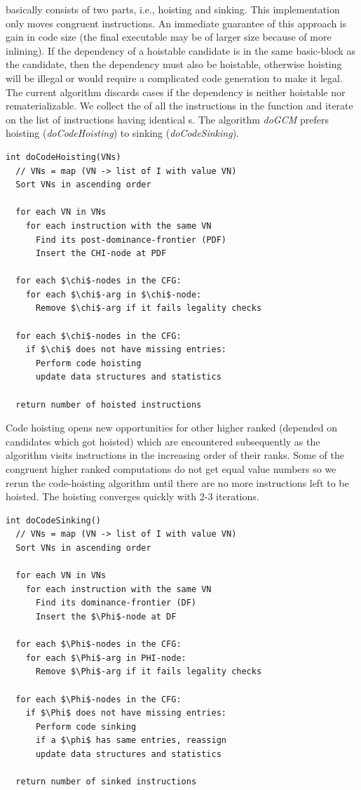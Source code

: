 \documentclass[sigplan,10pt,review,anonymous]{acmart}\settopmatter{printfolios=true,printccs=false,printacmref=false}
\begin{document}
\GCM{} basically consists of two parts, i.e., hoisting and sinking. This
implementation only moves congruent instructions. An immediate guarantee of this
approach is gain in code size (the final executable may be of larger size
because of more inlining). If the dependency of a hoistable candidate is in the
same basic-block as the candidate, then the dependency must also be hoistable,
otherwise hoisting will be illegal or would require a complicated code
generation to make it legal. The current algorithm discards cases if the
dependency is neither hoistable nor rematerializable. We collect the \GVN{} of
all the instructions in the function and iterate on the list of instructions
having identical \GVN{}s. The algorithm \emph{doGCM} prefers hoisting
(\emph{doCodeHoisting}) to sinking (\emph{doCodeSinking}).

\begin{lstlisting}
int doCodeHoisting(VNs)
  // VNs = map (VN -> list of I with value VN)
  Sort VNs in ascending order

  for each VN in VNs
    for each instruction with the same VN
      Find its post-dominance-frontier (PDF)
      Insert the CHI-node at PDF

  for each $\chi$-nodes in the CFG:
    for each $\chi$-arg in $\chi$-node:
      Remove $\chi$-arg if it fails legality checks

  for each $\chi$-nodes in the CFG:
    if $\chi$ does not have missing entries:
      Perform code hoisting
      update data structures and statistics

  return number of hoisted instructions
\end{lstlisting}


Code hoisting opens new opportunities for other higher ranked
\cite{rosen1988global} (depended on candidates which got hoisted) which are
encountered subsequently as the algorithm visits instructions in the increasing
order of their ranks. Some of the congruent higher ranked computations do not
get equal value numbers so we rerun the code-hoisting algorithm until there are
no more instructions left to be hoisted. The hoisting converges quickly with 2-3
iterations.

\begin{lstlisting}
int doCodeSinking()
  // VNs = map (VN -> list of I with value VN)
  Sort VNs in ascending order

  for each VN in VNs
    for each instruction with the same VN
      Find its dominance-frontier (DF)
      Insert the $\Phi$-node at DF

  for each $\Phi$-nodes in the CFG:
    for each $\Phi$-arg in PHI-node:
      Remove $\Phi$-arg if it fails legality checks

  for each $\Phi$-nodes in the CFG:
    if $\Phi$ does not have missing entries:
      Perform code sinking
      if a $\phi$ has same entries, reassign
      update data structures and statistics

  return number of sinked instructions
\end{lstlisting}
\end{document}
